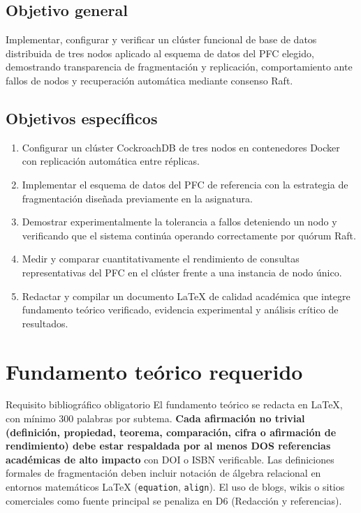 \documentclass[11pt,a4paper]{article}
\begin{document}
\subsection*{Objetivo general}

Implementar, configurar y verificar un cl\'uster funcional de base de datos distribuida de tres nodos aplicado al esquema de datos del PFC elegido, demostrando transparencia de fragmentaci\'on y replicaci\'on, comportamiento ante fallos de nodos y recuperaci\'on autom\'atica mediante consenso Raft.

\subsection*{Objetivos espec\'ificos}

\begin{enumerate}[leftmargin=1.6em]
    \item Configurar un cl\'uster CockroachDB de tres nodos en contenedores Docker con replicaci\'on autom\'atica entre r\'eplicas.
    \item Implementar el esquema de datos del PFC de referencia con la estrategia de fragmentaci\'on dise\~nada previamente en la asignatura.
    \item Demostrar experimentalmente la tolerancia a fallos deteniendo un nodo y verificando que el sistema contin\'ua operando correctamente por qu\'orum Raft.
    \item Medir y comparar cuantitativamente el rendimiento de consultas representativas del PFC en el cl\'uster frente a una instancia de nodo \'unico.
    \item Redactar y compilar un documento LaTeX de calidad acad\'emica que integre fundamento te\'orico verificado, evidencia experimental y an\'alisis cr\'itico de resultados.
\end{enumerate}

\section{Fundamento te\'orico requerido}

\begin{uteqwarn}[width=\linewidth]{Requisito bibliogr\'afico obligatorio}
\small\justifying
El fundamento te\'orico se redacta en LaTeX, con m\'inimo 300 palabras por subtema. \textbf{Cada afirmaci\'on no trivial (definici\'on, propiedad, teorema, comparaci\'on, cifra o afirmaci\'on de rendimiento) debe estar respaldada por al menos DOS referencias acad\'emicas de alto impacto} con DOI o ISBN verificable. Las definiciones formales de fragmentaci\'on deben incluir notaci\'on de \'algebra relacional en entornos matem\'aticos LaTeX (\texttt{equation}, \texttt{align}). El uso de blogs, wikis o sitios comerciales como fuente principal se penaliza en D6 (Redacci\'on y referencias).
\end{uteqwarn}
\end{document}
